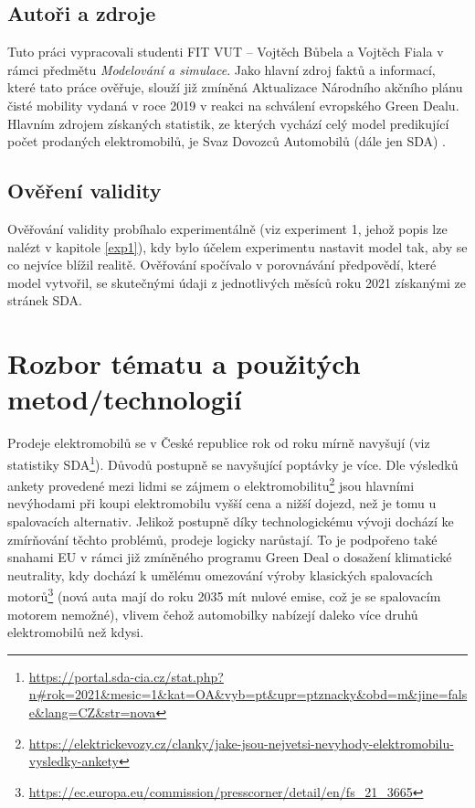 \documentclass[14pt]{extarticle}
\begin{document}
	\subsection{Autoři a zdroje}
	Tuto práci vypracovali studenti FIT VUT -- Vojtěch Bůbela a Vojtěch Fiala v rámci předmětu\textit{ Modelování a simulace}. Jako hlavní zdroj faktů a informací, které tato práce ověřuje, slouží již zmíněná Aktualizace Národního akčního plánu čisté mobility vydaná v roce 2019 \cite{NAP} v reakci na schválení evropského Green Dealu.
	Hlavním zdrojem získaných statistik, ze kterých vychází celý model predikující počet prodaných elektromobilů, je Svaz Dovozců Automobilů (dále jen SDA) \cite{SDA}.
	
	\subsection{Ověření validity}
	Ověřování validity probíhalo experimentálně (viz experiment 1, jehož popis lze nalézt v kapitole \ref{exp1}), kdy bylo účelem experimentu nastavit model tak, aby se co nejvíce blížil realitě. Ověřování spočívalo v porovnávání předpovědí, které model vytvořil, se skutečnými údaji z jednotlivých měsíců roku 2021 získanými ze stránek SDA.
	
	\section{Rozbor tématu a použitých metod/technologií}
	\label{s2}
	Prodeje elektromobilů se v České republice rok od roku mírně navyšují (viz statistiky  SDA\footnote{\url{https://portal.sda-cia.cz/stat.php?n\#rok=2021\&mesic=1\&kat=OA\&vyb=pt\&upr=ptznacky\&obd=m\&jine=false\&lang=CZ\&str=nova}}). Důvodů postupně se navyšující poptávky je více. Dle výsledků ankety provedené mezi lidmi se zájmem o elektromobilitu\footnote{\url{https://elektrickevozy.cz/clanky/jake-jsou-nejvetsi-nevyhody-elektromobilu-vysledky-ankety}} jsou hlavními nevýhodami při koupi elektromobilu vyšší cena a nižší dojezd, než je tomu u spalovacích alternativ. Jelikož postupně díky technologickému vývoji dochází ke zmírňování těchto problémů, prodeje logicky narůstají. To je podpořeno také snahami EU v rámci již zmíněného programu Green Deal o dosažení klimatické neutrality, kdy dochází k umělému omezování výroby klasických spalovacích motorů\footnote{\url{https://ec.europa.eu/commission/presscorner/detail/en/fs_21_3665}} (nová auta mají do roku 2035 mít nulové emise, což je se spalovacím motorem nemožné), vlivem čehož automobilky nabízejí daleko více druhů elektromobilů než kdysi. 
\end{document}
